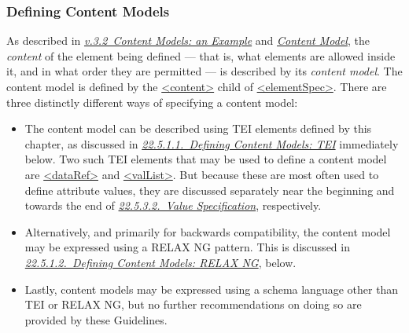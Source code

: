 \subsubsection[{Defining Content Models}]{Defining Content Models}\label{DEFCON}\par
As described in \textit{\hyperref[SG132]{v.3.2\ Content Models: an Example}} and \textit{\hyperref[SG143]{Content Model}}, the \textit{content} of the element being defined — that is, what elements are allowed inside it, and in what order they are permitted — is described by its \textit{content model}. The content model is defined by the \hyperref[TEI.content]{<content>} child of \hyperref[TEI.elementSpec]{<elementSpec>}. There are three distinctly different ways of specifying a content model: \begin{itemize}
\item The content model can be described using TEI elements defined by this chapter, as discussed in \textit{\hyperref[DEFCONTEI]{22.5.1.1.\ Defining Content Models: TEI}} immediately below. Two such TEI elements that may be used to define a content model are \hyperref[TEI.dataRef]{<dataRef>} and \hyperref[TEI.valList]{<valList>}. But because these are most often used to define attribute values, they are discussed separately near the beginning and towards the end of \textit{\hyperref[TDATTvs]{22.5.3.2.\ Value Specification}}, respectively.
\item Alternatively, and primarily for backwards compatibility, the content model may be expressed using a RELAX NG pattern. This is discussed in \textit{\hyperref[TDTAGCONT]{22.5.1.2.\ Defining Content Models: RELAX NG}}, below.
\item Lastly, content models may be expressed using a schema language other than TEI or RELAX NG, but no further recommendations on doing so are provided by these Guidelines.
\end{itemize} 
